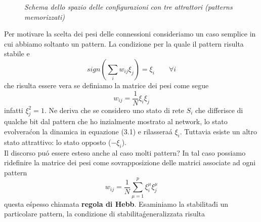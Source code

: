\documentclass[12pt, a4paper]{book}
\theoremstyle{theorem}
\begin{document}
\begin{figure}
					\caption{\textit{Schema dello spazio delle configurazioni con tre attrattori (patterns memorizzati)}}
				\end{figure}
				
				Per motivare la scelta dei pesi delle connessioni consideriamo un caso semplice in cui abbiamo soltanto un pattern. La condizione per la quale il pattern risulta stabile e\'
				\begin{equation}
					sign \left( \sum_i w_{ij} \xi_j\right) = \xi_i \quad \quad \forall i
				\end{equation} 
				che risulta essere vera se definiamo la matrice dei pesi come segue
				\begin{equation}
					w_{ij} = \frac{1}{N} \xi_i\xi_j
				\end{equation}
				infatti $\xi_j^2=1$.
				Ne deriva che se considero uno stato di rete $S_i$ che differisce di qualche bit dal pattern che ho inzialmente mostrato al network, lo stato evolvera\' con la dinamica in equazione (3.1) e rilassera\' a $\xi_i$.
				Tuttavia esiste un altro stato attrattivo: lo stato opposto ($-\xi_i$).\\
				Il discorso pu\'o essere esteso anche al caso molti pattern? In tal caso possiamo ridefinire la matrice dei pesi come sovrapposizione delle matrici associate ad ogni pattern
				\begin{equation}
					w_{ij} = \frac{1}{N} \sum_{\mu = 1}^{p} \xi_{i}^{\mu} \xi_{j}^{\mu}
				\end{equation} questa e\' spesso chiamata {\bf regola di Hebb}.
				Esaminiamo la stabilita\' di un particolare pattern, la condizione di stabilita\' generalizzata risulta
\end{document}
